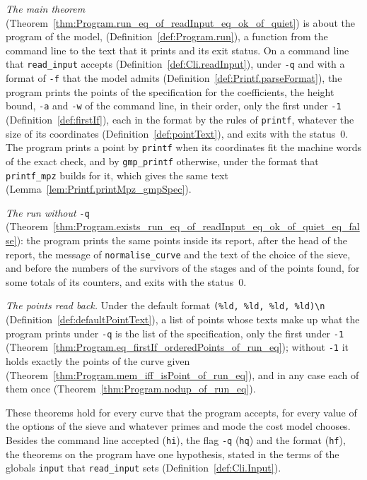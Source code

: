 \emph{The main theorem} (Theorem~\ref{thm:Program.run_eq_of_readInput_eq_ok_of_quiet}) is about the
program of the model,  (Definition~\ref{def:Program.run}), a function
from the command line to the text that it prints and its exit status. On a command line that
\texttt{read\_input} accepts (Definition~\ref{def:Cli.readInput}), under \verb|-q| and with a format
of \verb|-f| that the model admits (Definition~\ref{def:Printf.parseFormat}), the program prints the
points of the specification for the coefficients, the height bound, \verb|-a| and \verb|-w| of the
command line, in their order, only the first under \verb|-1| (Definition~\ref{def:firstIf}), each in
the format by the rules of \texttt{printf}, whatever the size of its coordinates
(Definition~\ref{def:pointText}), and exits with the status~$0$. The program prints a point by
\texttt{printf} when its coordinates fit the machine words of the exact check, and by
\texttt{gmp\_printf} otherwise, under the format that \texttt{printf\_mpz} builds for it, which
gives the same text (Lemma~\ref{lem:Printf.printMpz_gmpSpec}).

\emph{The run without} \verb|-q|
(Theorem~\ref{thm:Program.exists_run_eq_of_readInput_eq_ok_of_quiet_eq_false}): the program prints
the same points inside its report, after the head of the report, the message of
\texttt{normalise\_curve} and the text of the choice of the sieve, and before the numbers of the
survivors of the stages and of the points found, for some totals of its counters, and exits with the
status~$0$.

\emph{The points read back.} Under the default format \verb|(%ld, %ld, %ld, %ld)\n|
(Definition~\ref{def:defaultPointText}), a list of points whose texts make up what the program
prints under \verb|-q| is the list of the specification, only the first under \verb|-1|
(Theorem~\ref{thm:Program.eq_firstIf_orderedPoints_of_run_eq}); without \verb|-1| it holds exactly
the points of the curve given (Theorem~\ref{thm:Program.mem_iff_isPoint_of_run_eq}), and in any case
each of them once (Theorem~\ref{thm:Program.nodup_of_run_eq}).

These theorems hold for every curve that the program accepts, for every value of the options of the
sieve and whatever primes and mode the cost model chooses. Besides the command line accepted
(\verb|hi|), the flag \verb|-q| (\verb|hq|) and the format (\verb|hf|), the theorems on the program
have one hypothesis, stated in the terms of the globals \verb|input| that \texttt{read\_input} sets
(Definition~\ref{def:Cli.Input}).

